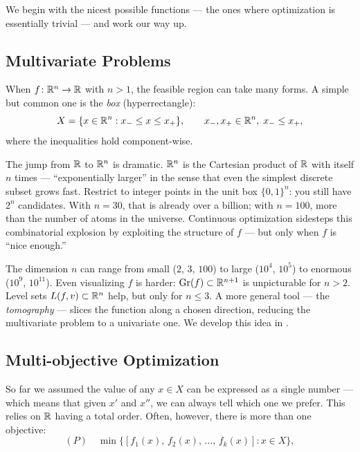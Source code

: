 We begin with the nicest possible functions --- the ones where optimization is essentially trivial --- and work our way up.


\subsection{Multivariate Problems}\label{ssec:multivariate}

\begin{defn}\label{def:multivariate}
	When $f \colon \mathbb{R}^n \to \mathbb{R}$ with $n > 1$, the feasible region can take many forms.
	A simple but common one is the \textit{box} (hyperrectangle):
	\begin{equation}\label{eq:box-constraint}
		X = \{x \in \mathbb{R}^n : x_- \leq x \leq x_+\},
		\qquad x_-, x_+ \in \mathbb{R}^n,\; x_- \leq x_+,
	\end{equation}
	where the inequalities hold component-wise.
\end{defn}

The jump from $\mathbb{R}$ to $\mathbb{R}^n$ is dramatic.
$\mathbb{R}^n$ is the Cartesian product of $\mathbb{R}$ with itself $n$ times --- ``exponentially larger'' in the sense that even the simplest discrete subset grows fast.
Restrict to integer points in the unit box $\{0,1\}^n$: you still have $2^n$ candidates.
With $n = 30$, that is already over a billion; with $n = 100$, more than the number of atoms in the universe.
Continuous optimization sidesteps this combinatorial explosion by exploiting the structure of $f$ --- but only when $f$ is ``nice enough.''

The dimension $n$ can range from small ($2$, $3$, $100$) to large ($10^4$, $10^5$) to enormous ($10^9$, $10^{11}$).
Even visualizing $f$ is harder: $\operatorname{Gr}(f) \subset \mathbb{R}^{n+1}$ is unpicturable for $n > 2$.
Level sets $L(f, v) \subset \mathbb{R}^n$ help, but only for $n \leq 3$.
A more general tool --- the \textit{tomography} --- slices the function along a chosen direction, reducing the multivariate problem to a univariate one.
We develop this idea in .


\subsection{Multi-objective Optimization}\label{ssec:multi-obj}

So far we assumed the value of any $x \in X$ can be expressed as a single number --- which means that given $x'$ and $x''$, we can always tell which one we prefer.
This relies on $\mathbb{R}$ having a total order.
Often, however, there is more than one objective:
\begin{equation}
    (P) \quad \min\bigl\{[f_1(x),\, f_2(x),\, \dots,\, f_k(x)] : x \in X\bigr\},
\end{equation}

